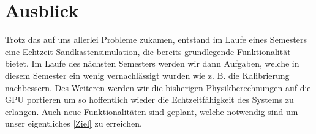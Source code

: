 \chapter{Ausblick}
	\begin{Spacing}{\mylinespace}
	Trotz das auf uns allerlei Probleme zukamen, entstand im Laufe eines Semesters eine Echtzeit Sandkastensimulation, die bereits grundlegende Funktionalität bietet. 
	Im Laufe des nächsten Semesters werden wir dann Aufgaben, welche in diesem Semester ein wenig vernachlässigt wurden wie z. B. die Kalibrierung nachbessern.
	Des Weiteren werden wir die bisherigen Physikberechnungen auf die GPU portieren um so hoffentlich wieder die Echtzeitfähigkeit des Systems zu erlangen.
	Auch neue Funktionalitäten sind geplant, welche notwendig sind um unser eigentliches \ref{Ziel} zu erreichen.
	
\end{Spacing}
\newpage
\clearpage

